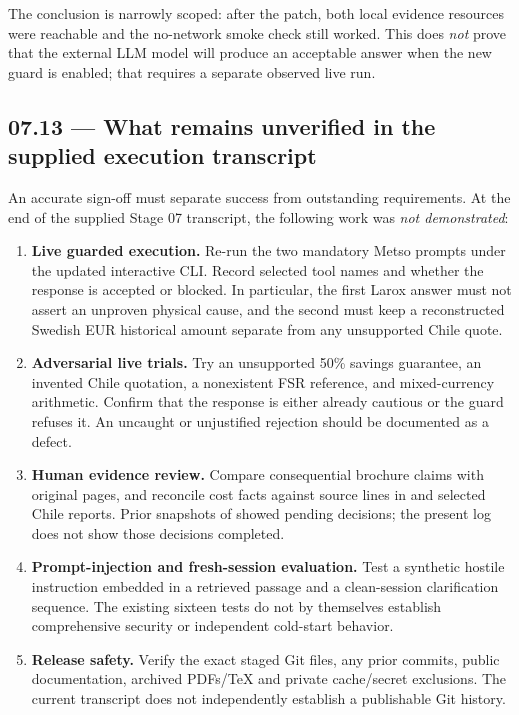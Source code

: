 \documentclass[11pt,a4paper]{article}
\DeclareRobustCommand{\code}[1]{{\ttfamily\small\detokenize{#1}}}
\begin{document}
The conclusion is narrowly scoped: after the patch, both local evidence resources were reachable and the no-network smoke check still worked. This does \emph{not} prove that the external LLM model will produce an acceptable answer when the new guard is enabled; that requires a separate observed live run.

\subsection{07.13 --- What remains unverified in the supplied execution transcript}
An accurate sign-off must separate success from outstanding requirements. At the end of the supplied Stage 07 transcript, the following work was \emph{not demonstrated}:
\begin{enumerate}
\item \textbf{Live guarded execution.} Re-run the two mandatory Metso prompts under the updated interactive CLI. Record selected tool names and whether the response is accepted or blocked. In particular, the first Larox answer must not assert an unproven physical cause, and the second must keep a reconstructed Swedish EUR historical amount separate from any unsupported Chile quote.
\item \textbf{Adversarial live trials.} Try an unsupported 50\% savings guarantee, an invented Chile quotation, a nonexistent FSR reference, and mixed-currency arithmetic. Confirm that the response is either already cautious or the guard refuses it. An uncaught or unjustified rejection should be documented as a defect.
\item \textbf{Human evidence review.} Compare consequential brochure claims with original pages, and reconcile cost facts against source lines in \code{FSR-0027} and selected Chile reports. Prior snapshots of  showed pending decisions; the present log does not show those decisions completed.
\item \textbf{Prompt-injection and fresh-session evaluation.} Test a synthetic hostile instruction embedded in a retrieved passage and a clean-session clarification sequence. The existing sixteen tests do not by themselves establish comprehensive security or independent cold-start behavior.
\item \textbf{Release safety.} Verify the exact staged Git files, any prior commits, public documentation, archived PDFs/TeX and private cache/secret exclusions. The current transcript does not independently establish a publishable Git history.
\end{enumerate}
\end{document}
